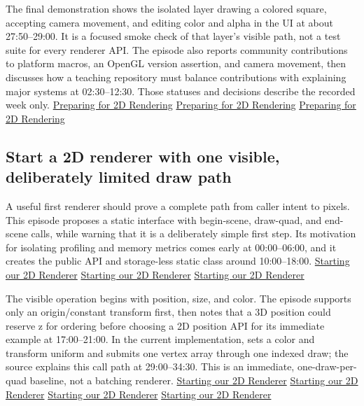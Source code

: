 The final demonstration shows the isolated layer drawing a colored square, accepting camera movement, and editing color and alpha in the UI at about 27:50--29:00. It is a focused smoke check of that layer's visible path, not a test suite for every renderer API. The episode also reports community contributions to platform macros, an OpenGL version assertion, and camera movement, then discusses how a teaching repository must balance contributions with explaining major systems at 02:30--12:30. Those statuses and decisions describe the recorded week only. \href{https://www.youtube.com/watch?v=sEiZZ2APlDs&t=1670s}{Preparing for 2D Rendering} \href{https://www.youtube.com/watch?v=sEiZZ2APlDs&t=150s}{Preparing for 2D Rendering} \href{https://www.youtube.com/watch?v=sEiZZ2APlDs&t=600s}{Preparing for 2D Rendering}

\subsection{Start a 2D renderer with one visible, deliberately limited draw path}\label{06-engine-ii-ch025-start-a-2d-renderer-with-one-visible-deliberately-limited-draw-path}

\hypertarget{06-engine-ii-ch025-start-a-2d-renderer-with-one-visible-deliberately-limited-draw-path}{}

A useful first renderer should prove a complete path from caller intent to pixels. This episode proposes a static  interface with begin-scene, draw-quad, and end-scene calls, while warning that it is a deliberately simple first step. Its motivation for isolating profiling and memory metrics comes early at 00:00--06:00, and it creates the public API and storage-less static class around 10:00--18:00. \href{https://www.youtube.com/watch?v=r_5fF1AxgpU&t=0s}{Starting our 2D Renderer} \href{https://www.youtube.com/watch?v=r_5fF1AxgpU&t=360s}{Starting our 2D Renderer} \href{https://www.youtube.com/watch?v=r_5fF1AxgpU&t=600s}{Starting our 2D Renderer}

The visible operation begins with position, size, and color. The episode supports only an origin/constant transform first, then notes that a 3D position could reserve z for ordering before choosing a 2D position API for its immediate example at 17:00--21:00. In the current implementation,  sets a color and transform uniform and submits one vertex array through one indexed draw; the source explains this call path at 29:00--34:30. This is an immediate, one-draw-per-quad baseline, not a batching renderer. \href{https://www.youtube.com/watch?v=r_5fF1AxgpU&t=1020s}{Starting our 2D Renderer} \href{https://www.youtube.com/watch?v=r_5fF1AxgpU&t=1260s}{Starting our 2D Renderer} \href{https://www.youtube.com/watch?v=r_5fF1AxgpU&t=1740s}{Starting our 2D Renderer} \href{https://www.youtube.com/watch?v=r_5fF1AxgpU&t=2040s}{Starting our 2D Renderer}

